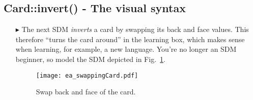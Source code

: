 \newpage
\subsection{Card::invert() - The visual syntax}
\visHeader
\hypertarget{invertCard vis}{}

\begin{itemize}

\item[$\blacktriangleright$] The next SDM \emph{inverts} a card by swapping its back and face values. This therefore ``turns the card around'' in the learning box, which makes sense when
learning, for example, a new language. You're no longer an SDM beginner, so model the SDM depicted in Fig.~\ref{fig:sdm_invert}.

\begin{figure}[htbp]
\begin{center}
  \texttt{[image: ea\_swappingCard.pdf]}
  \caption{Swap back and face of the card.}  
  \label{fig:sdm_invert}
\end{center}
\end{figure}

\end{itemize}
